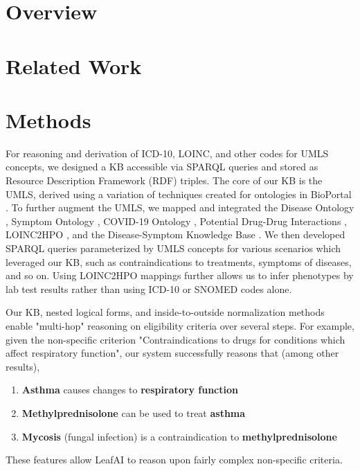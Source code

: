 \documentclass[../main.tex]{subfiles}
\begin{document}
\section{Overview}


\section{Related Work}


\section{Methods}

For reasoning and derivation of ICD-10, LOINC, and other codes for UMLS concepts, we designed a KB accessible via SPARQL queries and stored as Resource Description Framework (RDF) \cite{manola2004rdf} triples. The core of our KB is the UMLS, derived using a variation of techniques created for ontologies in BioPortal \cite{noy2009bioportal}. To further augment the UMLS, we mapped and integrated the Disease Ontology \cite{schriml2012disease}, Symptom Ontology \cite{sayers2010database}, COVID-19 Ontology \cite{sargsyan2020covid}, Potential Drug-Drug Interactions \cite{ayvaz2015toward}, LOINC2HPO \cite{zhang2019semantic}, and the Disease-Symptom Knowledge Base \cite{wang2008automated}. We then developed SPARQL queries parameterized by UMLS concepts for various scenarios which leveraged our KB, such as contraindications to treatments, symptoms of diseases, and so on. Using LOINC2HPO mappings further allows us to infer phenotypes by lab test results rather than using ICD-10 or SNOMED codes alone. 

Our KB, nested logical forms, and inside-to-outside normalization methods enable "multi-hop" reasoning on eligibility criteria over several steps. For example, given the non-specific criterion "Contraindications to drugs for conditions which affect respiratory function", our system successfully reasons that (among other results),

\begin{enumerate}
    \item \textbf{Asthma} causes changes to \textbf{respiratory function}
    \item \textbf{Methylprednisolone} can be used to treat \textbf{asthma}
    \item \textbf{Mycosis} (fungal infection) is a contraindication to \textbf{methylprednisolone}
\end{enumerate}

\noindent These features allow LeafAI to reason upon fairly complex non-specific criteria.
\end{document}
